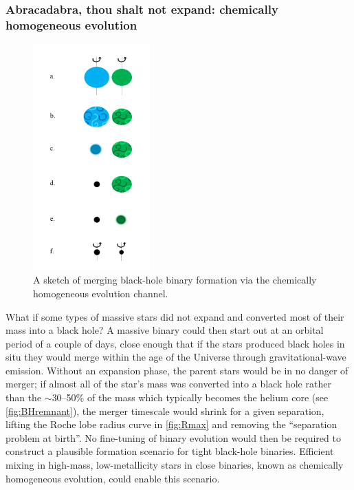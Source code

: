 \documentclass[review]{elsarticle}
\begin{document}
\subsubsection{Abracadabra, thou shalt not expand: chemically homogeneous evolution}\label{sec:CHE}

\begin{figure}
	\centering
	\includegraphics[width=0.4\textwidth]{channel2.png}
	\caption{\label{fig:chem_homog} A sketch of merging black-hole binary formation via the chemically homogeneous evolution channel.}
\end{figure}

What if some types of massive stars did not expand and converted most of their mass into a black hole? A massive binary could then start out at an orbital period of a couple of days, close enough that if the stars produced black holes in situ they would merge within the age of the Universe through gravitational-wave emission. Without an expansion phase, the parent stars would be in no danger of merger; if almost all of the star's mass was converted into a black hole rather than the $\sim$30--50\% of the mass which typically becomes the helium core (see \autoref{fig:BHremnant}), the merger timescale would shrink for a given separation, lifting the Roche lobe radius curve in \autoref{fig:Rmax} and removing the ``separation problem at birth''.  No fine-tuning of binary evolution would then be required to construct a plausible formation scenario for tight black-hole binaries.   Efficient mixing in high-mass, low-metallicity stars in close binaries, known as chemically homogeneous evolution, could enable this scenario.
\end{document}
